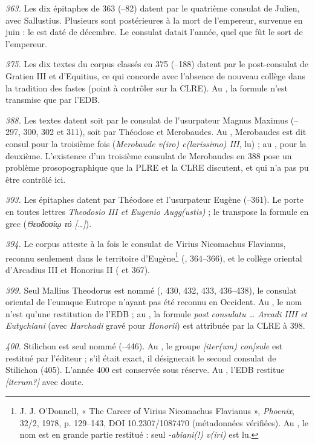 \emph{363.} Les dix épitaphes de 363 (–82) datent par le quatrième consulat de Julien, avec Sallustius. Plusieurs sont postérieures à la mort de l’empereur, survenue en juin : le  est daté de décembre. Le consulat datait l’année, quel que fût le sort de l’empereur.

\emph{375.} Les dix textes du corpus classés en 375 (–188) datent par le post-consulat de Gratien III et d’Equitius, ce qui concorde avec l’absence de nouveau collège dans la tradition des fastes (point à contrôler sur la CLRE). Au , la formule n’est transmise que par l’EDB.

\emph{388.} Les textes datent soit par le consulat de l’usurpateur Magnus Maximus (–297, 300, 302 et 311), soit par Théodose et Merobaudes. Au , Merobaudes est dit consul pour la troisième fois (\emph{Merobaude v(iro) c(larissimo) III}, lu) ; au , pour la deuxième. L’existence d’un troisième consulat de Merobaudes en 388 pose un problème prosopographique que la PLRE et la CLRE discutent, et qui n’a pas pu être contrôlé ici.

\emph{393.} Les épitaphes datent par Théodose et l’usurpateur Eugène (–361). Le  porte en toutes lettres \emph{Theodosio III et Eugenio Augg(ustis)} ; le  transpose la formule en grec (\emph{Θεοδοσίῳ τό […]}).

\emph{394.} Le corpus atteste à la fois le consulat de Virius Nicomachus Flavianus, reconnu seulement dans le territoire d’Eugène\footnote{J. J. O’Donnell, « The Career of Virius Nicomachus Flavianus », \emph{Phoenix}, 32/2, 1978, p. 129–143, DOI 10.2307/1087470 (métadonnées vérifiées). Au , le nom est en grande partie restitué : seul \emph{-abiani(!) v(iri)} est lu.} (, 364–366), et le collège oriental d’Arcadius III et Honorius II ( et 367).

\emph{399.} Seul Mallius Theodorus est nommé (, 430, 432, 433, 436–438), le consulat oriental de l’eunuque Eutrope n’ayant pas été reconnu en Occident. Au , le nom n’est qu’une restitution de l’EDB ; au , la formule \emph{post consulatu … Arcadi IIII et Eutychiani} (avec \emph{Harchadi} gravé pour \emph{Honorii}) est attribuée par la CLRE à 398.

\emph{400.} Stilichon est seul nommé (–446). Au , le groupe \emph{[iter(um) con]sule} est restitué par l’éditeur ; s’il était exact, il désignerait le second consulat de Stilichon (405). L’année 400 est conservée sous réserve. Au , l’EDB restitue \emph{[iterum?]} avec doute.


